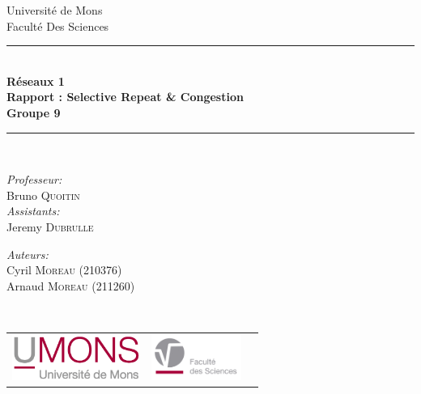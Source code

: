 \documentclass{article}
\begin{document}
\begin{titlepage}
    \begin{center}
        
        {\Large Université de Mons}\\[1ex]
        {\Large Faculté Des Sciences}\\[1ex]
        
        \newcommand{\HRule}{\rule{\linewidth}{0.3mm}}
        \HRule \\[0.5cm]
        { \LARGE \bfseries Réseaux 1 \\[0.3cm]}
        { \LARGE \bfseries Rapport : Selective Repeat \& Congestion \\[0.1cm]} %
        { \LARGE \bfseries Groupe 9 \\ [0.05cm]}
        \HRule \\[1.5cm]
        
        \begin{minipage}[t]{0.45\textwidth}
            \begin{flushleft} \large
                \emph{Professeur:}\\
                Bruno \textsc{Quoitin}\\
                \emph{Assistants:}\\
                Jeremy \textsc{Dubrulle}\\
            \end{flushleft}
        \end{minipage}
        \begin{minipage}[t]{0.45\textwidth}
            \begin{flushright} \large
                \emph{Auteurs:} \\
                Cyril \textsc{Moreau} (210376)\\
                Arnaud \textsc{Moreau} (211260)\\
            \end{flushright}
        \end{minipage}\\[2ex]
        
        \vfill
        
        \begin{center}
            \begin{tabular}[t]{c c c}
                \includegraphics[height=1.5cm]{UMONS-Logo.jpg} &
                \includegraphics[height=1.5cm]{FS-Logo.jpg} &
            \end{tabular}
        \end{center}~\\
        

\end{center}
\end{titlepage}
\end{document}
